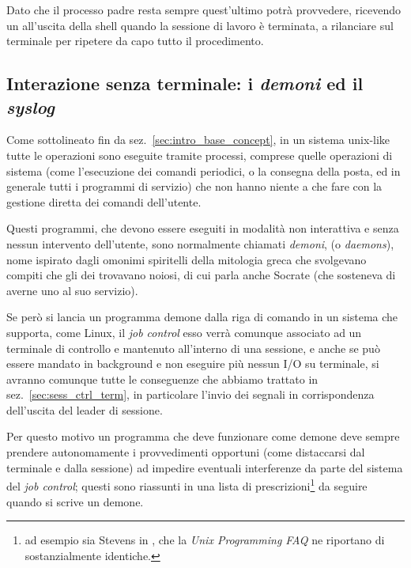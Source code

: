 Dato che il processo padre resta sempre  quest'ultimo potrà
provvedere, ricevendo un  all'uscita della shell quando la
sessione di lavoro è terminata, a rilanciare  sul terminale per
ripetere da capo tutto il procedimento.



\subsection{Interazione senza terminale: i \textsl{demoni} ed il
  \textit{syslog}}
\label{sec:sess_daemon}

Come sottolineato fin da sez.~\ref{sec:intro_base_concept}, in un sistema
unix-like tutte le operazioni sono eseguite tramite processi, comprese quelle
operazioni di sistema (come l'esecuzione dei comandi periodici, o la consegna
della posta, ed in generale tutti i programmi di servizio) che non hanno
niente a che fare con la gestione diretta dei comandi dell'utente.

Questi programmi, che devono essere eseguiti in modalità non interattiva e
senza nessun intervento dell'utente, sono normalmente chiamati
\textsl{demoni}, (o \textit{daemons}), nome ispirato dagli omonimi spiritelli
della mitologia greca che svolgevano compiti che gli dei trovavano noiosi, di
cui parla anche Socrate (che sosteneva di averne uno al suo servizio).


Se però si lancia un programma demone dalla riga di comando in un sistema che
supporta, come Linux, il \textit{job control} esso verrà comunque associato ad
un terminale di controllo e mantenuto all'interno di una sessione, e anche se
può essere mandato in background e non eseguire più nessun I/O su terminale,
si avranno comunque tutte le conseguenze che abbiamo trattato in
sez.~\ref{sec:sess_ctrl_term}, in particolare l'invio dei segnali in
corrispondenza dell'uscita del leader di sessione.

Per questo motivo un programma che deve funzionare come demone deve sempre
prendere autonomamente i provvedimenti opportuni (come distaccarsi dal
terminale e dalla sessione) ad impedire eventuali interferenze da parte del
sistema del \textit{job control}; questi sono riassunti in una lista di
prescrizioni\footnote{ad esempio sia Stevens in \cite{APUE}, che la
  \textit{Unix Programming FAQ} \cite{UnixFAQ} ne riportano di sostanzialmente
  identiche.} da seguire quando si scrive un demone.

